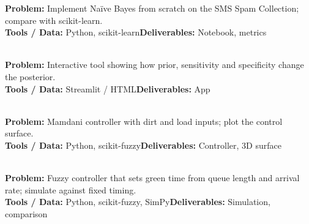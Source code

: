 \documentclass[11pt]{article}
\begin{document}
\begin{tcolorbox}[enhanced,breakable,colback=white,colframe=teal,arc=2mm,boxrule=0.9pt,
  title={\textbf{PIV.04\quad Na\"{i}ve Bayes SMS Spam Filter}\hfill \colorbox{white}{\textcolor{teal}{\scriptsize\bfseries MINI}}},fonttitle=\color{white},colbacktitle=teal]
\textbf{\color{navy}Problem:} Implement Na\"{i}ve Bayes from scratch on the SMS Spam Collection; compare with scikit-learn.\\[2pt]
\textbf{\color{navy}Tools / Data:} Python, scikit-learn\qquad \textbf{\color{navy}Deliverables:} Notebook, metrics\\[2pt]
\ 
\end{tcolorbox}
\begin{tcolorbox}[enhanced,breakable,colback=white,colframe=teal,arc=2mm,boxrule=0.9pt,
  title={\textbf{PIV.05\quad Bayes' Theorem Visual Calculator}\hfill \colorbox{white}{\textcolor{teal}{\scriptsize\bfseries MINI}}},fonttitle=\color{white},colbacktitle=teal]
\textbf{\color{navy}Problem:} Interactive tool showing how prior, sensitivity and specificity change the posterior.\\[2pt]
\textbf{\color{navy}Tools / Data:} Streamlit / HTML\qquad \textbf{\color{navy}Deliverables:} App\\[2pt]
\ 
\end{tcolorbox}
\begin{tcolorbox}[enhanced,breakable,colback=white,colframe=teal,arc=2mm,boxrule=0.9pt,
  title={\textbf{PIV.06\quad Fuzzy Washing-Machine Controller}\hfill \colorbox{white}{\textcolor{teal}{\scriptsize\bfseries MINI}}},fonttitle=\color{white},colbacktitle=teal]
\textbf{\color{navy}Problem:} Mamdani controller with dirt and load inputs; plot the control surface.\\[2pt]
\textbf{\color{navy}Tools / Data:} Python, scikit-fuzzy\qquad \textbf{\color{navy}Deliverables:} Controller, 3D surface\\[2pt]
\ 
\end{tcolorbox}
\begin{tcolorbox}[enhanced,breakable,colback=white,colframe=crimson,arc=2mm,boxrule=0.9pt,
  title={\textbf{PIV.07\quad Fuzzy Traffic-Signal Timing}\hfill \colorbox{white}{\textcolor{crimson}{\scriptsize\bfseries MAJOR}}},fonttitle=\color{white},colbacktitle=crimson]
\textbf{\color{navy}Problem:} Fuzzy controller that sets green time from queue length and arrival rate; simulate against fixed timing.\\[2pt]
\textbf{\color{navy}Tools / Data:} Python, scikit-fuzzy, SimPy\qquad \textbf{\color{navy}Deliverables:} Simulation, comparison\\[2pt]
\ 
\end{tcolorbox}
\end{document}
